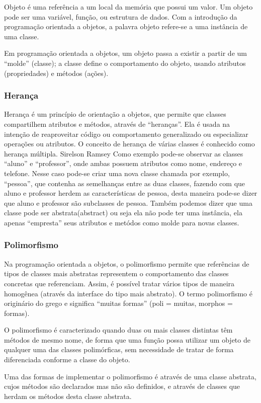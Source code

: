 Objeto é uma referência a um local da memória que possui um valor. Um objeto pode ser uma variável, função, ou estrutura de dados. Com a introdução da programação orientada a objetos, a palavra objeto refere-se a uma instância de uma classe.

Em programação orientada a objetos, um objeto passa a existir a partir de um ``molde'' (classe); a classe define o comportamento do objeto, usando atributos (propriedades) e métodos (ações).

\subsubsection{Herança}

Herança é um princípio de orientação a objetos, que permite que classes compartilhem atributos e métodos, através de ``heranças''. Ela é usada na intenção de reaproveitar código ou comportamento generalizado ou especializar operações ou atributos. O conceito de herança de várias classes é conhecido como herança múltipla. Sirelson Ramsey Como exemplo pode-se observar as classes ``aluno'' e ``professor'', onde ambas possuem atributos como nome, endereço e telefone. Nesse caso pode-se criar uma nova classe chamada por exemplo, ``pessoa'', que contenha as semelhanças entre as duas classes, fazendo com que aluno e professor herdem as características de pessoa, desta maneira pode-se dizer que aluno e professor são subclasses de pessoa. Também podemos dizer que uma classe pode ser abstrata(abstract) ou seja ela não pode ter uma instância, ela apenas ``empresta'' seus atributos e metódos como molde para novas classes.

\subsubsection{Polimorfismo}

Na programação orientada a objetos, o polimorfismo permite que referências de tipos de classes mais abstratas representem o comportamento das classes concretas que referenciam. Assim, é possível tratar vários tipos de maneira homogênea (através da interface do tipo mais abstrato). O termo polimorfismo é originário do grego e significa ``muitas formas'' (poli = muitas, morphos = formas).

O polimorfismo é caracterizado quando duas ou mais classes distintas têm métodos de mesmo nome, de forma que uma função possa utilizar um objeto de qualquer uma das classes polimórficas, sem necessidade de tratar de forma diferenciada conforme a classe do objeto.

Uma das formas de implementar o polimorfismo é através de uma classe abstrata, cujos métodos são declarados mas não são definidos, e através de classes que herdam os métodos desta classe abstrata.
